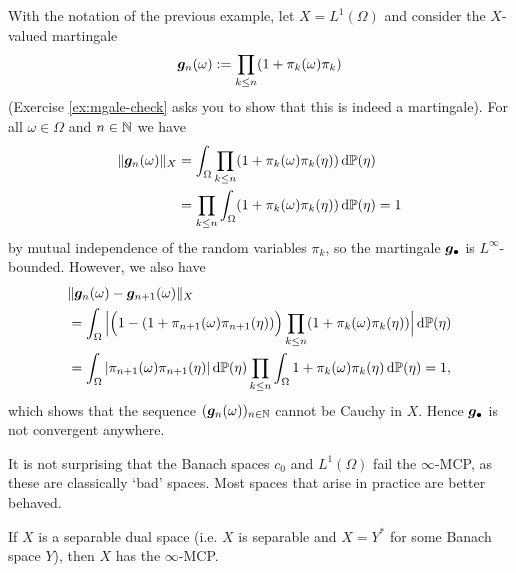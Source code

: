 \begin{example}\label{eg:L1-noMCP}
  With the notation of the previous example, let $X = L^1(\Omega)$ and consider the $X$-valued martingale
  \begin{equation}\label{eq:L1-example-mgale}
    \bm{g}_n(\omega) := \prod_{k \leq n} (1 + \pi_{k}(\omega)\pi_k)
  \end{equation}
  (Exercise \ref{ex:mgale-check} asks you to show that this is indeed a martingale).
  For all $\omega \in \Omega$ and $n \in \mathbb{N}$ we have
  \begin{equation*}
    \begin{aligned}
      \|\bm{g}_n(\omega)\|_{X} &= \int_{\Omega} \prod_{k \leq n} (1 + \pi_k(\omega)\pi_k(\eta))  \, \mathrm{d}\mathbb{P}(\eta) \\
      &= \prod_{k \leq n} \int_{\Omega}  (1 + \pi_k(\omega)\pi_k(\eta)) \, \mathrm{d}\mathbb{P}(\eta)
      = 1
    \end{aligned}
  \end{equation*}
  by mutual independence of the random variables $\pi_k$, so the martingale $\bm{g}_{\bullet}$ is $L^\infty$-bounded.
  However, we also have
  \begin{equation*}
    \begin{aligned}
      &\|\bm{g}_{n}(\omega) - \bm{g}_{n+1}(\omega)\|_{X} \\
      &= \int_{\Omega} \Big| \Big(1 - (1 + \pi_{n+1}(\omega)\pi_{n+1}(\eta))\Big)\prod_{k \leq n} (1 + \pi_k(\omega)\pi_k(\eta)) \Big|\, \mathrm{d}\mathbb{P}(\eta) \\
      &= \int_{\Omega} |\pi_{n+1}(\omega) \pi_{n+1}(\eta)| \, \mathrm{d}\mathbb{P}(\eta) \prod_{k \leq n} \int_{\Omega} 1 + \pi_k(\omega)\pi_k(\eta) \, \mathrm{d}\mathbb{P}(\eta) = 1,
    \end{aligned}
  \end{equation*}
  which shows that the sequence $(\bm{g}_n(\omega))_{n \in \mathbb{N}}$ cannot be Cauchy in $X$.
  Hence $\bm{g}_{\bullet}$ is not convergent anywhere.
\end{example}

It is not surprising that the Banach spaces $c_0$ and $L^1(\Omega)$ fail the $\infty$-MCP, as these are classically `bad' spaces.
Most spaces that arise in practice are better behaved.

\begin{thm}\label{thm:MCP-sepdual}
  If $X$ is a separable dual space (i.e. $X$ is separable and $X = Y^*$ for some Banach space $Y$), then $X$ has the $\infty$-MCP.
\end{thm}

